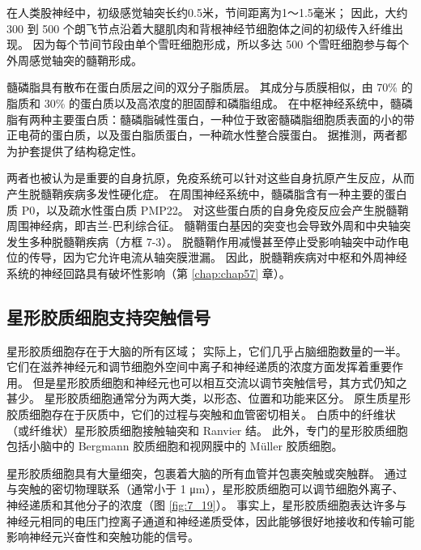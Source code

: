 在人类股神经中，初级感觉轴突长约0.5米，节间距离为1～1.5毫米； 
因此，大约 300 到 500 个朗飞节点沿着大腿肌肉和背根神经节细胞体之间的初级传入纤维出现。 
因为每个节间节段由单个雪旺细胞形成，所以多达 500 个雪旺细胞参与每个外周感觉轴突的髓鞘形成。


髓磷脂具有散布在蛋白质层之间的双分子脂质层。 
其成分与质膜相似，由 70\% 的脂质和 30\% 的蛋白质以及高浓度的胆固醇和磷脂组成。 
在中枢神经系统中，髓磷脂有两种主要蛋白质：髓磷脂碱性蛋白，一种位于致密髓磷脂细胞质表面的小的带正电荷的蛋白质，以及蛋白脂质蛋白，一种疏水性整合膜蛋白。 
据推测，两者都为护套提供了结构稳定性。


两者也被认为是重要的自身抗原，免疫系统可以针对这些自身抗原产生反应，从而产生脱髓鞘疾病多发性硬化症。 
在周围神经系统中，髓磷脂含有一种主要的蛋白质 P0，以及疏水性蛋白质 PMP22。 
对这些蛋白质的自身免疫反应会产生脱髓鞘周围神经病，即吉兰-巴利综合征。 
髓鞘蛋白基因的突变也会导致外周和中央轴突发生多种脱髓鞘疾病（方框 7-3）。 
脱髓鞘作用减慢甚至停止受影响轴突中动作电位的传导，因为它允许电流从轴突膜泄漏。 
因此，脱髓鞘疾病对中枢和外周神经系统的神经回路具有破坏性影响（第 \ref{chap:chap57} 章）。


\subsection{星形胶质细胞支持突触信号}
星形胶质细胞存在于大脑的所有区域； 实际上，它们几乎占脑细胞数量的一半。 
它们在滋养神经元和调节细胞外空间中离子和神经递质的浓度方面发挥着重要作用。 
但是星形胶质细胞和神经元也可以相互交流以调节突触信号，其方式仍知之甚少。 
星形胶质细胞通常分为两大类，以形态、位置和功能来区分。 
原生质星形胶质细胞存在于灰质中，它们的过程与突触和血管密切相关。 
白质中的纤维状（或纤维状）星形胶质细胞接触轴突和 Ranvier 结。 
此外，专门的星形胶质细胞包括小脑中的 Bergmann 胶质细胞和视网膜中的 Müller 胶质细胞。


星形胶质细胞具有大量细突，包裹着大脑的所有血管并包裹突触或突触群。 
通过与突触的密切物理联系（通常小于 1 μm），星形胶质细胞可以调节细胞外离子、神经递质和其他分子的浓度（图 \ref{fig:7_19}）。 
事实上，星形胶质细胞表达许多与神经元相同的电压门控离子通道和神经递质受体，因此能够很好地接收和传输可能影响神经元兴奋性和突触功能的信号。

